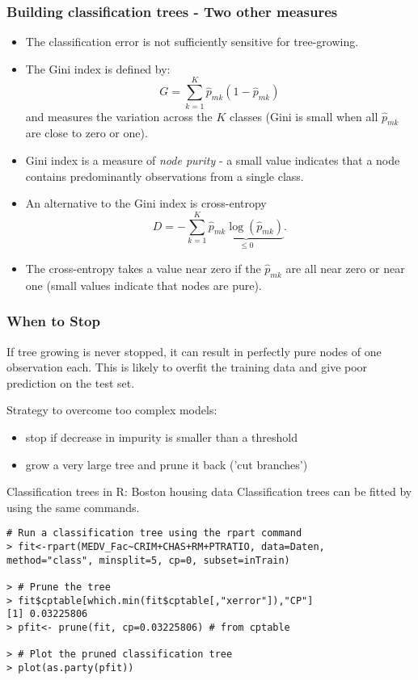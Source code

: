 \documentclass{beamer}
\begin{document}
\begin{frame}\frametitle{Building classification trees - Two other measures}
\begin{itemize}
\item The classification error is not sufficiently sensitive for
tree-growing.
\item The Gini index is defined by:
$$G=\sum_{k=1}^K\hat{p}_{mk}(1-\hat{p}_{mk})$$ and measures the variation across the $K$ classes (Gini is small when all $\hat{p}_{mk}$ are close to
zero or one).
\item Gini index is a measure of
\textit{node purity} - a small value indicates that a node contains
predominantly observations from a single class.
\item An alternative to the Gini index is cross-entropy
$$D=-\sum_{k=1}^K\underbrace{\hat{p}_{mk}\log(\hat{p}_{mk})}_{\leq 0}.$$
\item The cross-entropy takes a value near zero if the $\hat{p}_{mk}$ are all near
zero or near one (small values indicate that nodes are pure).
\end{itemize}
\end{frame}


\begin{frame}
	\frametitle{When to Stop}
	If tree growing is never stopped, it can result in perfectly pure nodes of 
	one observation each. This is likely to overfit the training data and give 
	poor prediction on the test set. 
	
	\vspace{0.3cm}
	
	Strategy to overcome too complex models:
	\begin{itemize}
		\item stop if decrease in impurity is smaller than a threshold
		\item grow a very large tree and prune it back ('cut branches')
	\end{itemize}
\end{frame}


\begin{frame}[fragile]{Classification trees in R: Boston housing data}
Classification trees can be fitted by using the same commands.
\begin{lstlisting}
# Run a classification tree using the rpart command
> fit<-rpart(MEDV_Fac~CRIM+CHAS+RM+PTRATIO, data=Daten, method="class", minsplit=5, cp=0, subset=inTrain)

> # Prune the tree
> fit$cptable[which.min(fit$cptable[,"xerror"]),"CP"]
[1] 0.03225806
> pfit<- prune(fit, cp=0.03225806) # from cptable

> # Plot the pruned classification tree
> plot(as.party(pfit))
\end{lstlisting}
\end{frame}
\end{document}
